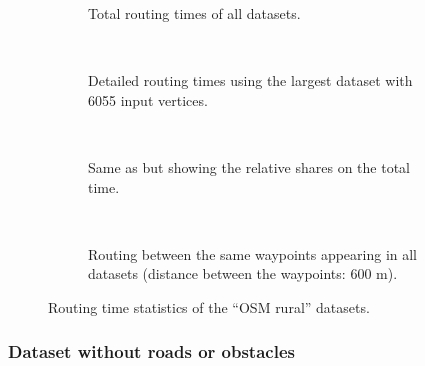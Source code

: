 			\clearpage
			\begin{figure}[h!]
				\begin{figcenter}
					\begin{subfigure}[t]{\textwidth}
						\begin{figcenter}
							
						\end{figcenter}
						\caption{Total routing times of all datasets.}
					\end{subfigure}
					\\[3ex]
					\begin{subfigure}[t]{\textwidth}
						\begin{figcenter}
							
						\end{figcenter}
						\caption{Detailed routing times using the largest dataset with 6055 input vertices.}
						\label{fig:eval-rural-routing-details-b}
					\end{subfigure}
					\\[3ex]
					\begin{subfigure}[t]{\textwidth}
						\begin{figcenter}
							
						\end{figcenter}
						\caption{Same as  but showing the relative shares on the total time.}
					\end{subfigure}
					\\[3ex]
					\begin{subfigure}[t]{\textwidth}
						\begin{figcenter}
							
						\end{figcenter}
						\caption{Routing between the same waypoints appearing in all datasets (distance between the waypoints: 600 m).}
					\end{subfigure}
				\end{figcenter}
				\caption{Routing time statistics of the \enquote{OSM rural} datasets.}
				\label{fig:eval-rural-routing-details}
			\end{figure}
			
		\subsubsection{Dataset without roads or obstacles}
		\label{subsubsec:dataset-without-roads-obstacles}
		
